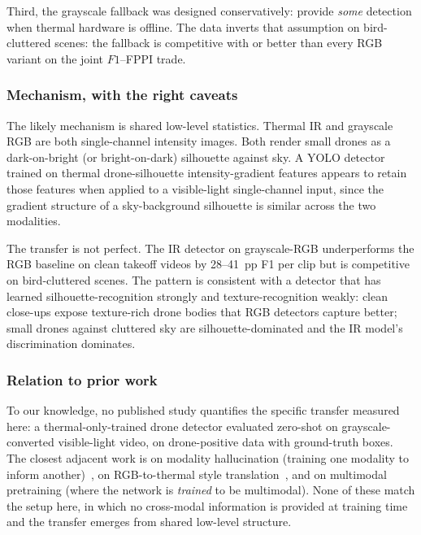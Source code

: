 Third, the grayscale fallback was designed conservatively: provide \emph{some} detection when thermal hardware is offline. The data inverts that assumption on bird-cluttered scenes: the fallback is competitive with or better than every RGB variant on the joint $F1$--FPPI trade.

\subsubsection{Mechanism, with the right caveats}

The likely mechanism is shared low-level statistics. Thermal IR and grayscale RGB are both single-channel intensity images. Both render small drones as a dark-on-bright (or bright-on-dark) silhouette against sky. A YOLO detector trained on thermal drone-silhouette intensity-gradient features appears to retain those features when applied to a visible-light single-channel input, since the gradient structure of a sky-background silhouette is similar across the two modalities.

The transfer is not perfect. The IR detector on grayscale-RGB underperforms the RGB baseline on clean takeoff videos by 28--41~pp F1 per clip but is competitive on bird-cluttered scenes. The pattern is consistent with a detector that has learned silhouette-recognition strongly and texture-recognition weakly: clean close-ups expose texture-rich drone bodies that RGB detectors capture better; small drones against cluttered sky are silhouette-dominated and the IR model's discrimination dominates.

\subsubsection{Relation to prior work}

To our knowledge, no published study quantifies the specific transfer measured here: a thermal-only-trained drone detector evaluated zero-shot on grayscale-converted visible-light video, on drone-positive data with ground-truth boxes. The closest adjacent work is on modality hallucination (training one modality to inform another)~\cite{hoffman2016modalityhallucination}, on RGB-to-thermal style translation~\cite{berg2018rgb2thermal,kniaz2018thermalgan}, and on multimodal pretraining (where the network is \emph{trained} to be multimodal). None of these match the setup here, in which no cross-modal information is provided at training time and the transfer emerges from shared low-level structure.

